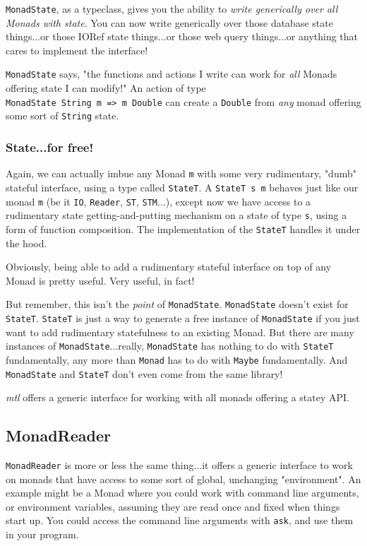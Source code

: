 \documentclass[]{article}
\begin{document}
\texttt{MonadState}, as a typeclass, gives you the ability to \emph{write
generically over all Monads with state}. You can now write generically over
those database state things...or those IORef state things...or those web query
things...or anything that cares to implement the interface!

\texttt{MonadState} says, "the functions and actions I write can work for
\emph{all} Monads offering state I can modify!" An action of type
\texttt{MonadState\ String\ m\ =\textgreater{}\ m\ Double} can create a
\texttt{Double} from \emph{any} monad offering some sort of \texttt{String}
state.

\subsubsection{State...for free!}

Again, we can actually imbue any Monad \texttt{m} with some very rudimentary,
"dumb" stateful interface, using a type called \texttt{StateT}. A
\texttt{StateT\ s\ m} behaves just like our monad \texttt{m} (be it \texttt{IO},
\texttt{Reader}, \texttt{ST}, \texttt{STM}...), except now we have access to a
rudimentary state getting-and-putting mechanism on a state of type \texttt{s},
using a form of function composition. The implementation of the \texttt{StateT}
handles it under the hood.

Obviously, being able to add a rudimentary stateful interface on top of any
Monad is pretty useful. Very useful, in fact!

But remember, this isn't the \emph{point} of \texttt{MonadState}.
\texttt{MonadState} doesn't exist for \texttt{StateT}. \texttt{StateT} is just a
way to generate a free instance of \texttt{MonadState} if you just want to add
rudimentary statefulness to an existing Monad. But there are many instances of
\texttt{MonadState}...really, \texttt{MonadState} has nothing to do with
\texttt{StateT} fundamentally, any more than \texttt{Monad} has to do with
\texttt{Maybe} fundamentally. And \texttt{MonadState} and \texttt{StateT} don't
even come from the same library!

\emph{mtl} offers a generic interface for working with all monads offering a
statey API.

\subsection{MonadReader}

\texttt{MonadReader} is more or less the same thing...it offers a generic
interface to work on monads that have access to some sort of global, unchanging
"environment". An example might be a Monad where you could work with command
line arguments, or environment variables, assuming they are read once and fixed
when things start up. You could access the command line arguments with
\texttt{ask}, and use them in your program.
\end{document}
